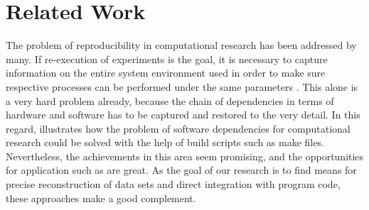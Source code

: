 \documentclass{acm_proc_article-sp}
\begin{document}
\section{Related Work}\label{sec:relatedwork}



The problem of reproducibility in computational research has been addressed by many.
If re-execution of experiments is the goal, it is necessary to capture information on the entire system environment used in order to make sure respective processes can be performed under the same parameters
%
%
%
\cite{DBLP_conf_ercimdl_Rauber12}
\cite{Rechert_2010_EBS_1816123_1816182}
.
This alone is a very hard problem already, because the chain of dependencies in terms of hardware and software has to be captured and restored to the very detail.
In this regard, \cite{Schwab_2000_MSC_369545_369555} illustrates how the problem of software dependencies for computational research could be solved with the help of build scripts such as make files.
Nevertheless, the achievements in this area seem promising, and the opportunities for application such as  
%
%
%
\cite{Nowakowski2011608} %
%
are great. %
As the goal of our research is to find means for precise reconstruction of data sets and direct integration with program code, these approaches make a good complement. %
\end{document}
